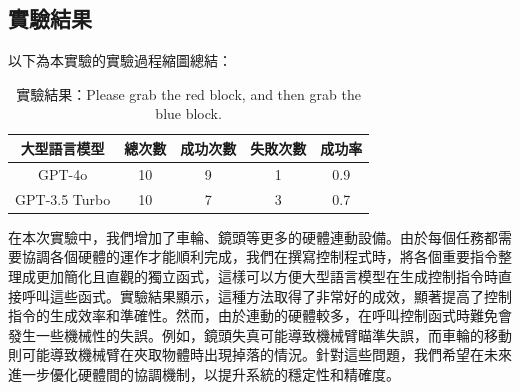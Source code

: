 \documentclass[class=NCU_thesis, crop=false]{standalone}
\begin{document}
\subsection{實驗結果}
以下為本實驗的實驗過程縮圖總結：\\


\begin{table}[h]
    \centering
    \caption{實驗結果：Please grab the red block, and then grab the blue block.}
    \begin{tabular}{ccccc}
    \hline
    大型語言模型 & 總次數 & 成功次數 & 失敗次數 & 成功率 \\
    \hline
    GPT-4o & 10 & 9 & 1 & 0.9\\
    \hline
    GPT-3.5 Turbo & 10 & 7 & 3 & 0.7\\
    \hline
    \end{tabular}
\end{table}
在本次實驗中，我們增加了車輪、鏡頭等更多的硬體連動設備。由於每個任務都需要協調各個硬體的運作才能順利完成，我們在撰寫控制程式時，將各個重要指令整理成更加簡化且直觀的獨立函式，這樣可以方便大型語言模型在生成控制指令時直接呼叫這些函式。實驗結果顯示，這種方法取得了非常好的成效，顯著提高了控制指令的生成效率和準確性。然而，由於連動的硬體較多，在呼叫控制函式時難免會發生一些機械性的失誤。例如，鏡頭失真可能導致機械臂瞄準失誤，而車輪的移動則可能導致機械臂在夾取物體時出現掉落的情況。針對這些問題，我們希望在未來進一步優化硬體間的協調機制，以提升系統的穩定性和精確度。
\end{document}
